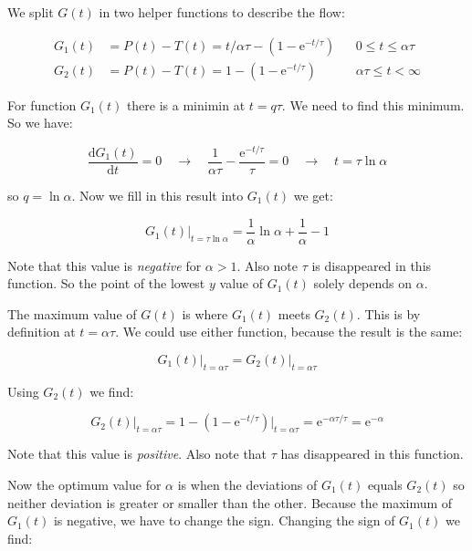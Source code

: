\documentclass[12pt]{article}
\def\me{\mathrm{e}}
\def\md{\mathrm{d}}
\begin{document}

We split $G(t)$ in two helper functions to describe the flow:

\begin{align}
G_1(t) &= P(t)-T(t) = t/\alpha\tau - (1-\me^{-t/\tau}) && 0 \leq t \leq \alpha\tau \\
G_2(t) &= P(t)-T(t) = 1 - (1-\me^{-t/\tau}) && \alpha\tau \leq t < \infty
\end{align}

For function $G_1(t)$ there is a minimin at $t=q\tau$. We need to find this minimum. So we have:

\begin{equation}
\frac{\md G_1(t)}{\md t} = 0 \quad\longrightarrow\quad \frac{1}{\alpha\tau} - \frac{\me^{-t/\tau}}{\tau} = 0 \quad \longrightarrow \quad t = \tau \ln \alpha
\end{equation}

so $q=\ln\alpha$. Now we fill in this result into $G_1(t)$ we get:

\begin{equation}
G_1(t) \big|_{t=\tau\ln\alpha} = \frac{1}{\alpha}\ln\alpha + \frac{1}{\alpha} - 1
\end{equation}

Note that this value is \emph{negative} for $\alpha>1$. Also note $\tau$ is disappeared in this function. So the point of the lowest $y$ value of $G_1(t)$ solely depends on $\alpha$.

The maximum value of $G(t)$ is where $G_1(t)$ meets $G_2(t)$. This is by definition at $t=\alpha\tau$. We could use either function, because the result is the same:

\begin{equation}
G_1(t)\big|_{t=\alpha\tau} = G_2(t)\big|_{t=\alpha\tau}
\end{equation}

Using $G_2(t)$ we find:

\begin{equation}
G_2(t)\big|_{t=\alpha\tau} = 1 - (1-\me^{-t/\tau})\big|_{t=\alpha\tau} = \me^{-\alpha\tau/\tau} = \me^{-\alpha}
\end{equation}

Note that this value is \emph{positive}. Also note that $\tau$ has disappeared in this function.


Now the optimum value for $\alpha$ is when the deviations of $G_1(t)$ equals $G_2(t)$ so neither deviation is greater or smaller than the other. Because the maximum of $G_1(t)$ is negative, we have to change the sign. Changing the sign of $G_1(t)$ we find:
\end{document}
